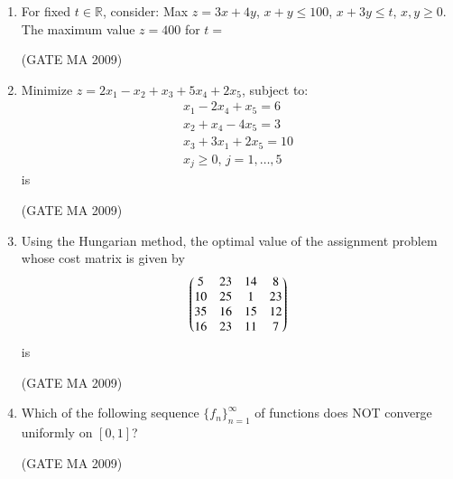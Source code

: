 \documentclass[journal,12pt,onecolumn]{IEEEtran}
\theoremstyle{remark}
\begin{document}
\begin{enumerate}[leftmargin=0pt, align=left, start=21]
\item For fixed $t\in\mathbb{R}$, consider: Max $z=3x+4y$, $x+y\leq100$, $x+3y\leq t$, $x,y\geq0$. The maximum value $z=400$ for $t=$
\begin{enumerate}
\end{enumerate}
\hfill (GATE MA 2009)

\item Minimize $z=2x_1-x_2+x_3+5x_4+2x_5$, subject to:
\[
\begin{array}{l}
x_1-2x_4+x_5=6 \\
x_2+x_4-4x_5=3 \\
x_3+3x_1+2x_5=10 \\
x_j\geq0,\,j=1,\ldots,5
\end{array}
\]
is
\begin{enumerate}
\end{enumerate}
\hfill (GATE MA 2009)

\item Using the Hungarian method, the optimal value of the assignment problem whose cost matrix is given by 
$$
\begin{pmatrix}
5 & 23 & 14 & 8 \\
10 & 25 & 1 & 23 \\
35 & 16 & 15 & 12 \\
16 & 23 & 11 & 7
\end{pmatrix}
$$
is
\begin{enumerate}
\end{enumerate}
\hfill (GATE MA 2009)

\item Which of the following sequence $\{f_n\}_{n=1}^\infty$ of functions does NOT converge uniformly on $[0,1]$?
\begin{enumerate}
\end{enumerate}
\hfill (GATE MA 2009)


\end{enumerate}
\end{document}
